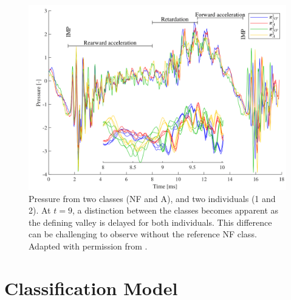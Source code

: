 \begin{figure}[!htb]
    \begin{center}
    \centerline{\includegraphics[width=0.9\linewidth]{figures/drill_2.png}}
    \caption{Pressure from two classes (NF and A), and two individuals (1 and 2). 
    At $t = 9$, a distinction between the classes becomes apparent as the defining valley is delayed for both individuals. This difference can be challenging to observe without the reference NF class.
    Adapted with permission from \cite{jakobsson2022dataset}.
    }
    \label{fig:phm_2}
    \end{center}
\end{figure}




\clearpage
\section{Classification Model}\label{sec:method_4}


